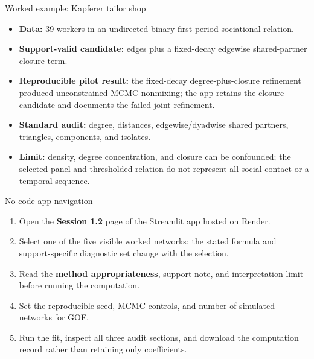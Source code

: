 \documentclass[aspectratio=169,11pt]{beamer}
\newcommand{\term}[1]{\textbf{\color{nupurple}#1}}
\begin{document}
\begin{frame}{Worked example: Kapferer tailor shop}
\begin{itemize}
\item \term{Data:} 39 workers in an undirected binary first-period sociational relation.
\item \term{Support-valid candidate:} edges plus a fixed-decay edgewise shared-partner closure term.
\item \term{Reproducible pilot result:} the fixed-decay degree-plus-closure refinement produced unconstrained MCMC nonmixing; the app retains the closure candidate and documents the failed joint refinement.
\item \term{Standard audit:} degree, distances, edgewise/dyadwise shared partners, triangles, components, and isolates.
\item \term{Limit:} density, degree concentration, and closure can be confounded; the selected panel and thresholded relation do not represent all social contact or a temporal sequence.
\end{itemize}
\end{frame}

\begin{frame}{No-code app navigation}
\begin{enumerate}
\item Open the \term{Session 1.2} page of the Streamlit app hosted on Render.
\item Select one of the five visible worked networks; the stated formula and support-specific diagnostic set change with the selection.
\item Read the \term{method appropriateness}, support note, and interpretation limit before running the computation.
\item Set the reproducible seed, MCMC controls, and number of simulated networks for GOF.
\item Run the fit, inspect all three audit sections, and download the computation record rather than retaining only coefficients.
\end{enumerate}
\end{frame}
\end{document}
